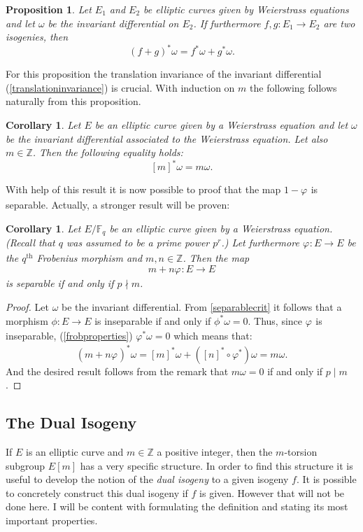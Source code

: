 \documentclass{article}
\numberwithin{equation}{section}
\newtheorem{proposition}[theorem]{Proposition}
\newtheorem{corollary}[theorem]{Corollary}
\theoremstyle{definition}
\newcommand{\ZZ}{{\mathbb Z}} %
\newcommand{\FF}[1]{{\mathbb F}_{#1}} %
\newcommand{\frob}[1][]{\varphi_{#1}} %
\begin{document}
\begin{proposition}
Let $E_1$ and $E_2$ be elliptic curves given by Weierstrass equations and let $\omega$ be the invariant differential on $E_2$. If furthermore $f,g: E_1 \rightarrow E_2$ are two isogenies, then $$(f+g)^*\omega=f^* \omega + g^* \omega.$$
\end{proposition}

For this proposition the translation invariance of the invariant differential (\ref{translationinvariance}) is crucial. With induction on $m$ the following follows naturally from this proposition.

\begin{corollary}\label{invdiffislinear}
Let $E$ be an elliptic curve given by a Weierstrass equation and let $\omega$ be the invariant differential associated to the Weierstrass equation. Let also $m\in \ZZ$. Then the following equality holds: $$[m]^* \omega = m \omega.$$
\end{corollary}

With help of this result it is now possible to proof that the map $1-\frob$ is separable. Actually, a stronger result will be proven:

\begin{corollary}\label{frobseparable}
Let $E/\FF{q}$ be an elliptic curve given by a Weierstrass equation. (Recall that $q$ was assumed to be a prime power $p^r$.) Let furthermore $\frob:E \rightarrow E$ be the $q^{\text{th}}$ Frobenius morphism and $m,n \in \ZZ$. Then the map $$m+n\frob:E \rightarrow E$$ is separable if and only if $p \nmid m$.
\end{corollary}

\begin{proof}
Let $\omega$ be the invariant differential. From \ref{separablecrit} it follows that a morphism $\phi: E \rightarrow E$ is inseparable if and only if $\phi^* \omega = 0$. Thus, since $\frob$ is inseparable, (\ref{frobproperties}) $\frob^*\omega = 0$ which means that: $$(m+n\frob)^*\omega=[m]^* \omega + ([n]^* \circ \frob^*) \omega = m\omega.$$ And the desired result follows from the remark that $m\omega = 0$ if and only if $p \mid m$.
\end{proof}






\subsection{The Dual Isogeny}
If $E$ is an elliptic curve and $m\in\ZZ$ a positive integer, then the $m$-torsion subgroup $E[m]$ has a very specific structure. In order to find this structure it is useful to develop the notion of the \emph{dual isogeny} to a given isogeny $f$. It is possible to concretely construct this dual isogeny if $f$ is given. However that will not be done here. I will be content with formulating the definition and stating its most important properties. 
\end{document}
